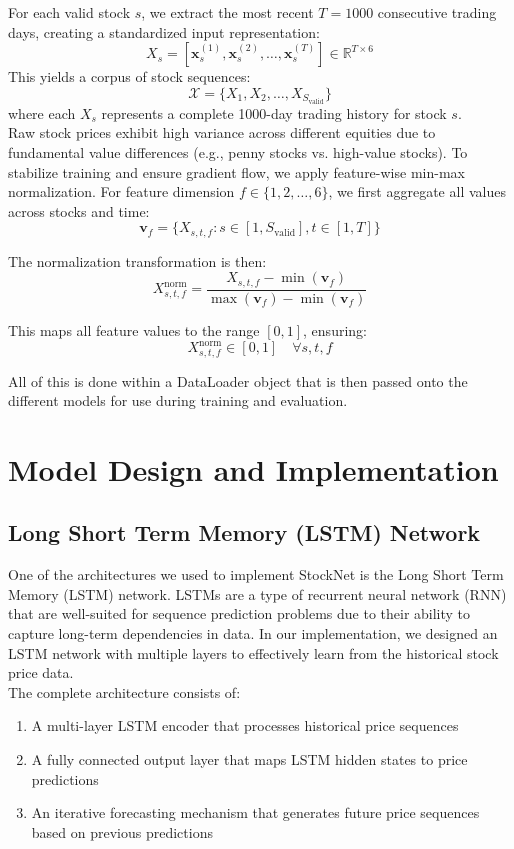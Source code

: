 \documentclass[sigconf]{acmart}
\begin{document}
For each valid stock $s$, we extract the most recent $T = 1000$ consecutive trading days, creating a standardized input representation:
$$X_s = [\mathbf{x}_s^{(1)}, \mathbf{x}_s^{(2)}, \ldots, \mathbf{x}_s^{(T)}] \in \mathbb{R}^{T \times 6}$$
This yields a corpus of stock sequences:
$$\mathcal{X} = \{X_1, X_2, \ldots, X_{S_{\text{valid}}}\}$$
where each $X_s$ represents a complete 1000-day trading history for stock $s$.\\

Raw stock prices exhibit high variance across different equities due to fundamental value differences (e.g., penny stocks vs. high-value stocks). To stabilize training and ensure gradient flow, we apply feature-wise min-max normalization. For feature dimension $f \in \{1, 2, \ldots, 6\}$, we first aggregate all values across stocks and time:
$$\mathbf{v}_f = \{X_{s,t,f} : s \in [1, S_{\text{valid}}], t \in [1, T]\}$$

The normalization transformation is then:
$$X_{s,t,f}^{\text{norm}} = \frac{X_{s,t,f} - \min(\mathbf{v}_f)}{\max(\mathbf{v}_f) - \min(\mathbf{v}_f)}$$

This maps all feature values to the range $[0, 1]$, ensuring:
$$X_{s,t,f}^{\text{norm}} \in [0, 1] \quad \forall s, t, f$$

All of this is done within a DataLoader object that is then passed onto the different models for use during training and evaluation.

\section{Model Design and Implementation}

\subsection{Long Short Term Memory (LSTM) Network}

One of the architectures we used to implement StockNet is the Long Short Term Memory (LSTM) network. LSTMs are a type of recurrent neural network (RNN) that are well-suited for sequence prediction problems due to their ability to capture long-term dependencies in data. In our implementation, we designed an LSTM network with multiple layers to effectively learn from the historical stock price data.\\

The complete architecture consists of:

\begin{enumerate}
  \item A multi-layer LSTM encoder that processes historical price sequences
  \item A fully connected output layer that maps LSTM hidden states to price predictions
  \item An iterative forecasting mechanism that generates future price sequences based on previous predictions
\end{enumerate}
\end{document}
